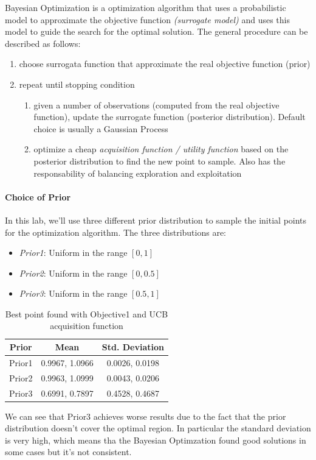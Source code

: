 Bayesian Optimization is a optimization algorithm that uses a probabilistic model to approximate the objective function \textit{(surrogate model)} and uses this model to guide the search for the optimal solution. The general procedure can be described as follows:
\begin{enumerate}
    \item choose surrogata function that approximate the real objective function (prior)
    \item repeat until stopping condition
          \begin{enumerate}
              \item given a number of observations (computed from the real objective function), update the surrogate function (posterior distribution). Default choice is usually a Gaussian Process
              \item optimize a cheap \textit{acquisition function / utility function} based on the posterior distribution to find the new point to sample. Also has the responsability of balancing exploration and exploitation
          \end{enumerate}
\end{enumerate}

\paragraph*{Choice of Prior}
In this lab, we'll use three different prior distribution to sample the initial points for the optimization algorithm. The three distributions are:
\begin{itemize}
    \item \textit{Prior1}: Uniform in the range $[0, 1]$
    \item \textit{Prior2}: Uniform in the range $[0, 0.5]$
    \item \textit{Prior3}: Uniform in the range $[0.5, 1]$
\end{itemize}
\begin{table}[H]
    \centering
    \begin{tabular}{|c|c|c|}
        \textbf{Prior} & \textbf{Mean}  & \textbf{Std. Deviation} \\\hline
        Prior1         & 0.9967, 1.0966 & 0.0026, 0.0198          \\
        Prior2         & 0.9963, 1.0999 & 0.0043, 0.0206          \\
        Prior3         & 0.6991, 0.7897 & 0.4528, 0.4687          \\
        \hline
    \end{tabular}
    \caption{Best point found with Objective1 and UCB acquisition function}
    \label{tab:prior}
\end{table}
We can see that Prior3 achieves worse results due to the fact that the prior distribution doesn't cover the optimal region. In particular the standard deviation is very high, which means tha the Bayesian Optimzation found good solutions in some cases but it's not consistent.

